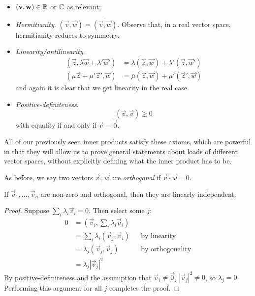 \documentclass{../../template/note}
\begin{document}
    \begin{itemize}
        \item \((\vec v, \vec w) \in \RR\) or \(\mathbb C\) as relevant;
        \item \emph{Hermitianity}. \((\vec v, \vec w) = \overline{(\vec v, \vec w)}\). Observe that, in a real vector space, hermitianity reduces to symmetry.
        \item \emph{Linearity/antilinearity}.
        \begin{align*}
            (\vec z, \lambda \vec w + \lambda ' \vec w') &= \lambda (\vec z, \vec w) + \lambda ' (\vec z, \vec w') \\
            (\mu \vec z + \mu' \vec z', \vec w) &= \bar \mu (\vec z, \vec w) + \overline{\mu'}(\vec z', \vec w)
        \end{align*}
        and again it is clear that we get linearity in the real case.
        \item \emph{Positive-definiteness}.
        \[
            (\vec v, \vec v) \geq 0
        \]
        with equality if and only if \(\vec v = \vec 0\).
    \end{itemize}
    
    All of our previously seen inner products satisfy these axioms, which are powerful in that they will allow us to prove general statements about loads of different vector spaces, without explicitly defining what the inner product has to be.

    \begin{definition}
        As before, we say two vectors \(\vec v\), \(\vec w\) are \emph{orthogonal} if \(\vec v \cdot \vec w = 0\).
    \end{definition}
    
    \begin{proposition}
        If \(\vec v_1, \dots, \vec v_n\) are non-zero and orthogonal, then they are linearly independent.
    \end{proposition}
    
    \begin{proof}
        Suppose \(\sum_{i} \lambda_i \vec v_i = 0\). Then select some \(j\):
        \begin{align*}
            0 &= \left(\vec v_i, \sum_i \lambda_i \vec v_i\right) \\
            &= \sum_i \lambda_i (\vec v_j, \vec v_i) && \text{by linearity} \\
            &= \lambda_j (\vec v_j, \vec v_j) && \text{by orthogonality} \\
            &= \lambda_j |\vec v_j|^2            
        \end{align*}
        By positive-definiteness and the assumption that \(\vec v_i \neq \vec 0\), \(|\vec v_j|^2 \neq 0\), so \(\lambda_j = 0\). Performing this argument for all \(j\) completes the proof.
    \end{proof}
    
\end{document}

